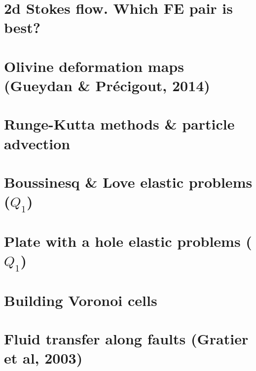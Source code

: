 \documentclass[a4paper,11pt]{report}
\begin{document}
\chapter{2d Stokes flow. Which FE pair is best? \label{f120}} %

\chapter{Olivine deformation maps (Gueydan \& Pr{\'e}cigout, 2014)  \label{f121}} %

\chapter{Runge-Kutta methods \& particle advection \label{f122}}%

\chapter{Boussinesq \& Love elastic problems ($Q_1$)\label{f123}} %

\chapter{Plate with a hole elastic problems ($Q_1$)\label{f124}} %

\chapter{Building Voronoi cells \label{f125}} %

\chapter{Fluid transfer along faults (Gratier et al, 2003)\label{f126}} %
\end{document}

